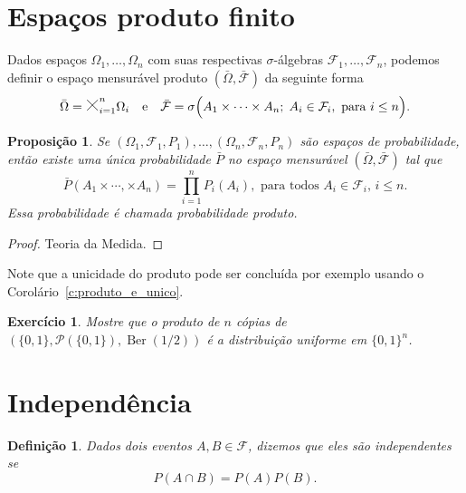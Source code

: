 \documentclass[reqno, draft]{book}
\newcommand*\1{\mathds{1}}
\newtheorem{proposition}[theorem]{Proposição}
\newtheorem{definition}[theorem]{Definição}
\newtheorem{exercise}[example]{Exercício}
\DeclareMathOperator{\Ber}{Ber}
\newcommand*\bigtimes{\tikz[baseline=0, scale=.3]{
\draw[opacity=0] (-.1,-.1) rectangle (1.1, 1.1);
\draw[line width=.5pt] (0,0) -- (1,1) (1,0) -- (0,1);}
}
\begin{document}
\section{Espaços produto finito}

Dados espaços $\Omega_1, \dots, \Omega_n$ com suas respectivas $\sigma$-álgebras $\mathcal{F}_1, \dots, \mathcal{F}_n$, podemos definir o espaço mensurável produto $(\bar{\Omega}, \bar{\mathcal{F}})$ da seguinte forma
\begin{equation}
  \bar{\Omega} = \bigtimes_{i=1}^n \Omega_i \quad \text{e} \quad \bar{\mathcal{F}} = \sigma \Big( A_1 \times \cdots \times A_n; \; A_i \in \mathcal{F}_i, \text{ para $i \leq n$} \Big).
\end{equation}

\begin{proposition}
  Se $(\Omega_1, \mathcal{F}_1, P_1), \dots, (\Omega_n, \mathcal{F}_n, P_n)$ são espaços de probabilidade, então existe uma única probabilidade $\bar{P}$ no espaço mensurável $(\bar{\Omega}, \bar{\mathcal{F}})$ tal que
  \begin{equation}
    \bar{P}(A_1 \times \cdots, \times A_n) = \prod_{i=1}^n P_i(A_i), \text{ para todos $A_i \in \mathcal{F}_i$, $i \leq n$.}
  \end{equation}
  Essa probabilidade é chamada probabilidade produto.
\end{proposition}

\begin{proof}
  Teoria da Medida.
\end{proof}

Note que a unicidade do produto pode ser concluída por exemplo usando o Corolário~\ref{c:produto_e_unico}.

\begin{exercise}
  Mostre que o produto de $n$ cópias de $(\{0,1\}, \mathcal{P}(\{0,1\}), \Ber(1/2))$ é a distribuição uniforme em $\{0,1\}^n$.
\end{exercise}


\section{Independência}

\begin{definition}
  Dados dois eventos $A, B \in \mathcal{F}$, dizemos que eles são \emph{independentes}  se
  \begin{equation}
    P(A \cap B) = P(A) P(B).
  \end{equation}
\end{definition}
\end{document}
